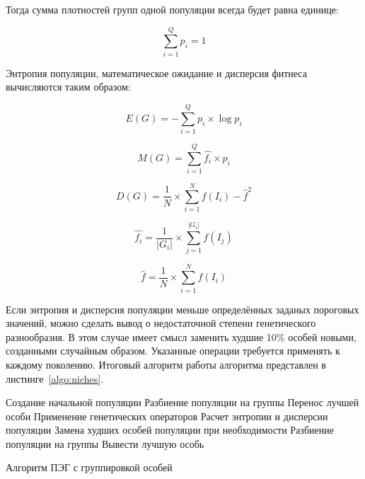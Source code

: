 Тогда сумма плотностей групп одной популяции всегда будет равна единице:

\begin{equation}
\label{eq:niches_p_i_sum_1}
\sum\limits_{i=1}^Q{p_i} = 1
\end{equation}

Энтропия популяции, математическое ожидание и дисперсия фитнеса вычисляются таким образом:

\begin{equation}
\label{eq:niches_E}
E(G) = - \sum\limits_{i=1}^Q{p_i \times \log{p_i}}
\end{equation}

\begin{equation}
\label{eq:niches_M}
M(G) = \sum\limits_{i=1}^Q{\hat{f_i} \times p_i}
\end{equation}

\begin{equation}
\label{eq:niches_D}
D(G) = \frac{1}{N} \times \sum\limits_{i=1}^{N}{{f(I_i) - \hat{f}}^2}
\end{equation}

\begin{equation}
\label{eq:niches_f_i_hat}
\hat{f_i} = \frac{1}{|G_i|} \times \sum\limits_{j=1}^{|G_i|}{f(I_j)}
\end{equation}

\begin{equation}
\label{eq:niches_f_hat}
\hat{f} = \frac{1}{N} \times \sum\limits_{i=1}^{N}{f(I_i)}
\end{equation}

Если энтропия и дисперсия популяции меньше определённых заданых пороговых значений, можно сделать вывод о недостаточной степени генетического разнообразия. В этом случае имеет смысл заменить худшие 10\% особей новыми, созданными случайным образом. Указанные операции требуется применять к каждому поколению. Итоговый алгоритм работы алгоритма представлен в листинге~\ref{algo:niches}.

\begin{algorithm}
\SetAlgoLined
{}
{
  Создание начальной популяции\;
  Разбиение популяции на группы\;
  {
    Перенос лучшей особи\;
    Применение генетических операторов\;
  }
  Расчет энтропии и дисперсии популяции\;
  Замена худших особей популяции при необходимости\;
  Разбиение популяции на группы\;
}
Вывести лучшую особь\;
\caption{Алгоритм ПЭГ с группировкой особей}
\label{algo:niches}
\end{algorithm}

